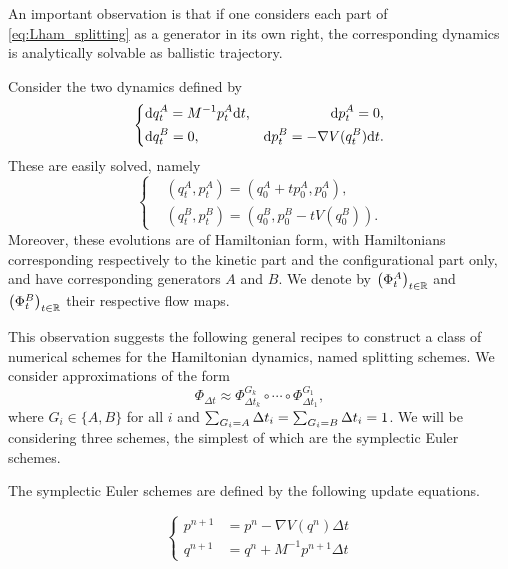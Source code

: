     An important observation is that if one considers each part of \eqref{eq:Lham_splitting} as a generator in its own right, the corresponding dynamics is analytically solvable as ballistic trajectory.
    \begin{remark}
        \label{rem:Lham_splitting_semigroups}
        Consider the two dynamics defined by
        \begin{equation}
            \label{eq:Lham_splitting_dynamics}
            \left\{\begin{aligned}
                &\mathrm{d} q_t^A=M^{-1}p_t^A\mathrm{d} t, &\mathrm{d} p_t^A=0,\\
                &\mathrm{d} q_t^B=0, &\mathrm{d} p_t^B=-\nabla V(q_t^B)\mathrm{d} t.
            \end{aligned}\right.
        \end{equation}
        These are easily solved, namely
        \begin{equation}
            \label{eq:Lham_splitting_dynamics_solved}
            \left\{\begin{aligned}
                &\left(q_t^A,p_t^A\right)=\left(q_0^A+tp_0^A,p_0^A\right),\\
                &\left(q_t^B,p_t^B\right)=\left(q_0^B,p_0^B-tV\left(q_0^B\right)\right).
            \end{aligned}\right.
        \end{equation} 
        Moreover, these evolutions are of Hamiltonian form, with Hamiltonians corresponding respectively to the kinetic part and the configurational part only, and have corresponding generators $A$ and $B$.
        We denote by $\left(\Phi^A_t\right)_{t \in \mathbb{R}}$ and $\left(\Phi^B_t\right)_{t\in\mathbb{R}}$ their respective flow maps.
    \end{remark}
    This observation suggests the following general recipes to construct a class of numerical schemes for the Hamiltonian dynamics, named splitting schemes. We consider approximations of the form
    \begin{equation}\label{eq:flow_splitting_approximation}\Phi_{\Delta t}\approx \Phi^{G_k}_{\Delta t_k}\circ \dotsm \circ \Phi^{G_1}_{\Delta t_1},\end{equation}
    where $G_i\in\{A,B\}$ for all $i$ and $\sum_{G_i=A}{\Delta t}_i=\sum_{G_i=B}{\Delta t}_i=1$. We will be considering three schemes, the simplest of which are the symplectic Euler schemes.
    
    The symplectic Euler schemes are defined by the following update equations.
    
    \begin{equation}\label{eq:symplectic_euler_A}
    \left\{\begin{aligned}
         p^{n+1} &=p^n -\nabla V(q^n)\Delta t\\
         q^{n+1} &=q^n + M^{-1}p^{n+1}\Delta t
    \end{aligned}\right.
    \end{equation}

